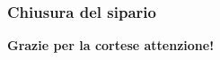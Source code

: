 \begin{frame}

\frametitle{Chiusura del sipario}
\begin{center}
\Huge{\textbf{Grazie per la cortese attenzione!}}
\end{center}
\end{frame}
